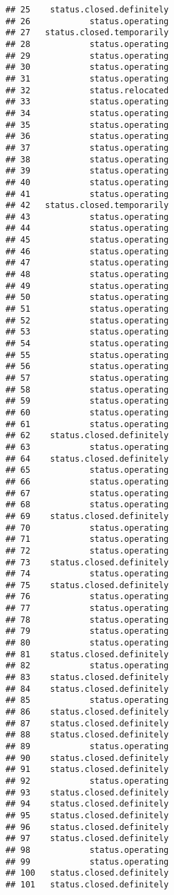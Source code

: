 \documentclass[
]{article}
\begin{document}
\begin{verbatim}
## 25    status.closed.definitely
## 26            status.operating
## 27   status.closed.temporarily
## 28            status.operating
## 29            status.operating
## 30            status.operating
## 31            status.operating
## 32            status.relocated
## 33            status.operating
## 34            status.operating
## 35            status.operating
## 36            status.operating
## 37            status.operating
## 38            status.operating
## 39            status.operating
## 40            status.operating
## 41            status.operating
## 42   status.closed.temporarily
## 43            status.operating
## 44            status.operating
## 45            status.operating
## 46            status.operating
## 47            status.operating
## 48            status.operating
## 49            status.operating
## 50            status.operating
## 51            status.operating
## 52            status.operating
## 53            status.operating
## 54            status.operating
## 55            status.operating
## 56            status.operating
## 57            status.operating
## 58            status.operating
## 59            status.operating
## 60            status.operating
## 61            status.operating
## 62    status.closed.definitely
## 63            status.operating
## 64    status.closed.definitely
## 65            status.operating
## 66            status.operating
## 67            status.operating
## 68            status.operating
## 69    status.closed.definitely
## 70            status.operating
## 71            status.operating
## 72            status.operating
## 73    status.closed.definitely
## 74            status.operating
## 75    status.closed.definitely
## 76            status.operating
## 77            status.operating
## 78            status.operating
## 79            status.operating
## 80            status.operating
## 81    status.closed.definitely
## 82            status.operating
## 83    status.closed.definitely
## 84    status.closed.definitely
## 85            status.operating
## 86    status.closed.definitely
## 87    status.closed.definitely
## 88    status.closed.definitely
## 89            status.operating
## 90    status.closed.definitely
## 91    status.closed.definitely
## 92            status.operating
## 93    status.closed.definitely
## 94    status.closed.definitely
## 95    status.closed.definitely
## 96    status.closed.definitely
## 97    status.closed.definitely
## 98            status.operating
## 99            status.operating
## 100   status.closed.definitely
## 101   status.closed.definitely

\end{verbatim}
\end{document}
